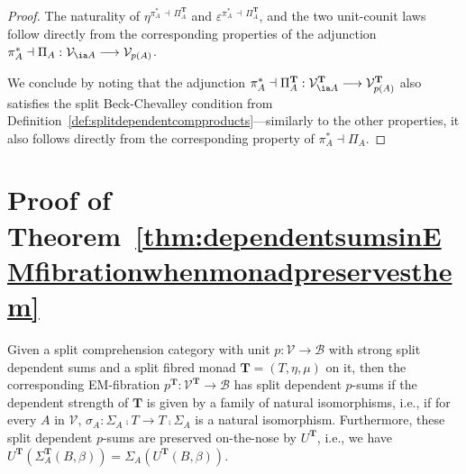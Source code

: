 \begin{proof}
The naturality of $\eta^{\pi^*_A \,\dashv\, \Pi^{\mathbf{T}}_A}$ and $\varepsilon^{\pi^*_A \,\dashv\, \Pi^{\mathbf{T}}_A}$, and the two unit-counit laws follow directly from the corresponding properties of the adjunction $\pi^*_A \dashv \Pi_A : \mathcal{V}_{\ia A} \longrightarrow \mathcal{V}_{p(A)}$.

We conclude by noting that the adjunction $\pi^*_A \dashv \Pi^{\mathbf{T}}_A : \mathcal{V}^{\mathbf{T}}_{\ia A} \longrightarrow \mathcal{V}^{\mathbf{T}}_{p(A)}$ also satisfies the split Beck-Chevalley condition from Definition~\ref{def:splitdependentcompproducts}---similarly to the other properties, it also follows directly from the corresponding property of $\pi^*_A \dashv \Pi_A$.
\end{proof}


\newpage

\section{Proof of Theorem~\ref{thm:dependentsumsinEMfibrationwhenmonadpreservesthem}}
\label{sect:proofofthm:dependentsumsinEMfibrationwhenmonadpreservesthem}

{
\renewcommand{\thetheorem}{\ref{thm:dependentsumsinEMfibrationwhenmonadpreservesthem}}
\begin{theorem}
Given a split comprehension category with unit $p : \mathcal{V} \longrightarrow \mathcal{B}$ with strong split dependent sums and a split fibred monad $\mathbf{T} = (T,\eta,\mu)$ on it, then the corresponding EM-fibration $p^{\mathbf{T}} : \mathcal{V}^{\mathbf{T}} \!\longrightarrow\! \mathcal{B}$ has split dependent $p$-sums if the dependent strength of $\mathbf{T}$ is given by a family of natural isomorphisms, i.e., if for every $A$ in $\mathcal{V}$, $\sigma_A : \Sigma_A \comp T \longrightarrow T \comp \Sigma_A$ is a natural isomorphism.
Furthermore, these split dependent $p$-sums are preserved on-the-nose by $U^{\mathbf{T}}$, i.e., we have $U^{\mathbf{T}}(\Sigma^{\mathbf{T}}_A(B,\beta)) = \Sigma_A(U^{\mathbf{T}}(B,\beta))$.
\end{theorem}
\addtocounter{theorem}{-1}
}


